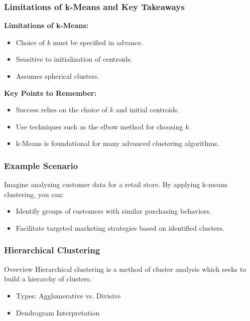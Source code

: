 \documentclass[aspectratio=169]{beamer}
\begin{document}
\begin{frame}[fragile]
    \frametitle{Limitations of k-Means and Key Takeaways}
    \textbf{Limitations of k-Means:}
    \begin{itemize}
        \item Choice of \( k \) must be specified in advance.
        \item Sensitive to initialization of centroids.
        \item Assumes spherical clusters.
    \end{itemize}

    \textbf{Key Points to Remember:}
    \begin{itemize}
        \item Success relies on the choice of \( k \) and initial centroids.
        \item Use techniques such as the elbow method for choosing \( k \).
        \item k-Means is foundational for many advanced clustering algorithms.
    \end{itemize}
\end{frame}

\begin{frame}[fragile]
    \frametitle{Example Scenario}
    Imagine analyzing customer data for a retail store. By applying k-means clustering, you can:
    \begin{itemize}
        \item Identify groups of customers with similar purchasing behaviors.
        \item Facilitate targeted marketing strategies based on identified clusters.
    \end{itemize}
\end{frame}

\begin{frame}[fragile]
    \frametitle{Hierarchical Clustering}
    \begin{block}{Overview}
        Hierarchical clustering is a method of cluster analysis which seeks to build a hierarchy of clusters.
    \end{block}
    \begin{itemize}
        \item Types: Agglomerative vs. Divisive
        \item Dendrogram Interpretation
    \end{itemize}
\end{frame}
\end{document}
